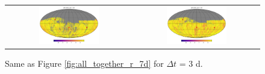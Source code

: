 \documentclass[preprintm,linenumbers]{aastex631}
\begin{document}
\begin{figure}
\begin{tabular}{c c}
         \includegraphics[width=0.5\textwidth]{results/skymaps_cutout/skymaps_cutout_delta_first_year_one_snap_v4_0_10yrs_db_noDD_noTwi_tscale-3_nside-256_doAllTemplateMetrics_reduceCount_g_noDD_noTwi.pdf} &
         \includegraphics[width=0.5\textwidth]{results/skymaps_cutout/skymaps_cutout_delta_first_year_one_snap_v4_0_10yrs_db_noDD_noTwi_tscale-3_nside-256_doAllTemplateMetrics_reduceCount_r_noDD_noTwi.pdf} \\

   \end{tabular}

        \caption{
        Same as Figure \ref{fig:all_together_r_7d} for $\Delta t$ = 3 d. 
        }
        \label{fig:all_together_r_3d}
	\end{figure}

  
\end{document}
